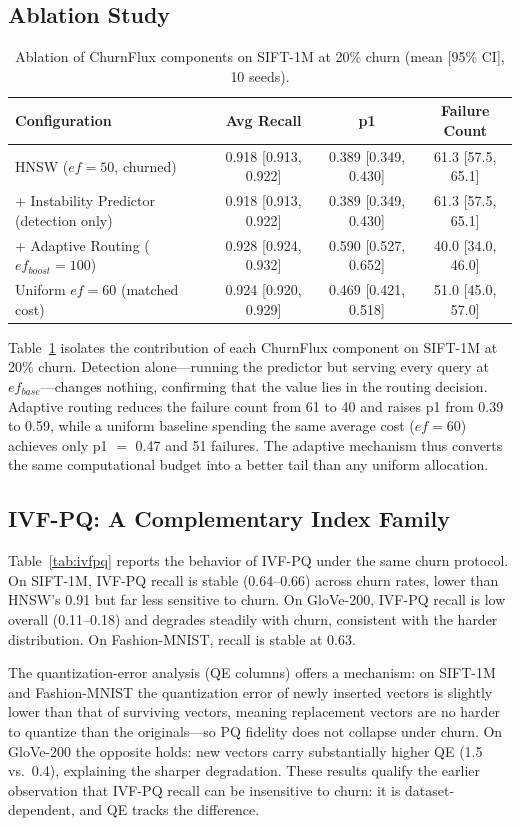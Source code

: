 \documentclass{ieeeaccess}
\begin{document}
\subsection{Ablation Study}
\begin{table}[t]
\centering
\caption{Ablation of ChurnFlux components on SIFT-1M at 20\% churn (mean [95\% CI], 10 seeds).}
\label{tab:ablation}
\begin{tabular}{lccc}
\toprule
Configuration & Avg Recall & p1 & Failure Count \\
\midrule
HNSW ($ef=50$, churned) & 0.918 [0.913, 0.922] & 0.389 [0.349, 0.430] & 61.3 [57.5, 65.1] \\
+ Instability Predictor (detection only) & 0.918 [0.913, 0.922] & 0.389 [0.349, 0.430] & 61.3 [57.5, 65.1] \\
+ Adaptive Routing ($ef_{boost}=100$) & 0.928 [0.924, 0.932] & 0.590 [0.527, 0.652] & 40.0 [34.0, 46.0] \\
Uniform $ef=60$ (matched cost) & 0.924 [0.920, 0.929] & 0.469 [0.421, 0.518] & 51.0 [45.0, 57.0] \\
\bottomrule
\end{tabular}
\end{table}

Table~\ref{tab:ablation} isolates the contribution of each ChurnFlux component on SIFT-1M at 20\% churn. Detection alone---running the predictor but serving every query at $ef_{base}$---changes nothing, confirming that the value lies in the routing decision. Adaptive routing reduces the failure count from 61 to 40 and raises p1 from 0.39 to 0.59, while a uniform baseline spending the same average cost ($ef=60$) achieves only p1 $=$ 0.47 and 51 failures. The adaptive mechanism thus converts the same computational budget into a better tail than any uniform allocation.

\subsection{IVF-PQ: A Complementary Index Family}
\label{sec:ivfpq}
Table~\ref{tab:ivfpq} reports the behavior of IVF-PQ under the same churn protocol. On SIFT-1M, IVF-PQ recall is stable (0.64--0.66) across churn rates, lower than HNSW's 0.91 but far less sensitive to churn. On GloVe-200, IVF-PQ recall is low overall (0.11--0.18) and degrades steadily with churn, consistent with the harder distribution. On Fashion-MNIST, recall is stable at 0.63.

The quantization-error analysis (QE columns) offers a mechanism: on SIFT-1M and Fashion-MNIST the quantization error of newly inserted vectors is slightly lower than that of surviving vectors, meaning replacement vectors are no harder to quantize than the originals---so PQ fidelity does not collapse under churn. On GloVe-200 the opposite holds: new vectors carry substantially higher QE (1.5 vs.\ 0.4), explaining the sharper degradation. These results qualify the earlier observation that IVF-PQ recall can be insensitive to churn: it is dataset-dependent, and QE tracks the difference.
\end{document}
